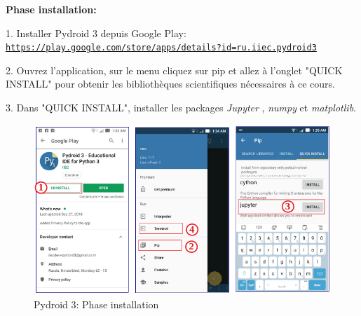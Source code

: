 \documentclass{beamer}
\begin{document}
\begin{frame}

\textbf{Phase installation:}

1. Installer Pydroid 3 depuis Google Play: \href{{https://play.google.com/store/apps/details?id=ru.iiec.pydroid3}}{\nolinkurl{https://play.google.com/store/apps/details?id=ru.iiec.pydroid3}}

2. Ouvrez l'application, sur le menu cliquez sur pip et allez à l'onglet "QUICK INSTALL" pour obtenir les bibliothèques scientifiques nécessaires à ce cours.

3. Dans "QUICK INSTALL", installer les packages \emph{Jupyter} , \emph{numpy} et \emph{matplotlib}.


\begin{figure}[!ht]  %
  \centerline{\includegraphics[width=0.7\linewidth]{figs/pydroid3_1.png}}
  \caption{
  Pydroid 3: Phase installation
  }
\end{figure}
\end{frame}
\end{document}
